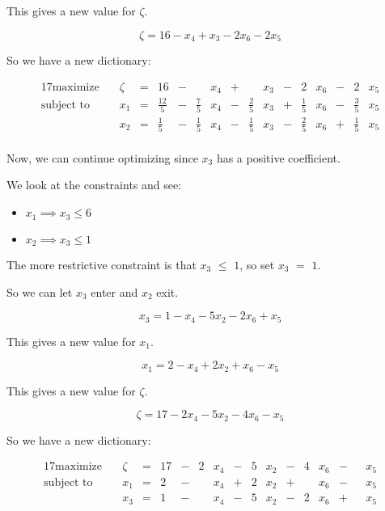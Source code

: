 \documentclass[12pt,letterpaper]{article}
\newcommand*\continueopt[1]{
  Now, we can continue optimizing since #1 has a positive coefficient.
}
\newcommand*\enterexit[2]{
  So we can let #1 enter and #2 exit.
}
\newcommand*\morerestrictive[2]{
  The more restrictive constraint is that #1 $\leq$ #2, so set #1 $=$ #2.
}
\newcommand*\newdict{
  So we have a new dictionary:
}
\newcommand*\newvalue[1]{
  This gives a new value for #1.
}
\begin{document}
\begin{enumerate}
      \newvalue{$\zeta$}

      \[
        \zeta = 16 - x_4 + x_3 - 2x_6 - 2x_5
      \]

      \newdict

      \begin{alignat*}{17}
        \text{maximize}   \quad & \zeta & {}={} & 16           & {}-{} &             & x_4 & {}+{} &             & x_3 & {}-{} & 2           & x_6 & {}-{} & 2            & x_5 \\
        \text{subject to} \quad & x_1   & {}={} & \frac{12}{5} & {}-{} & \frac{7}{5} & x_4 & {}-{} & \frac{2}{5} & x_3 & {}+{} & \frac{1}{5} & x_6 & {}-{} & \frac{3}{5} & x_5 \\
                                & x_2   & {}={} & \frac{1}{5}  & {}-{} & \frac{1}{5} & x_4 & {}-{} & \frac{1}{5} & x_3 & {}-{} & \frac{2}{5} & x_6 & {}+{} & \frac{1}{5} & x_5 \\
      \end{alignat*}

      \continueopt{$x_3$}

      We look at the constraints and see:
      \begin{itemize}
        \item $x_1 \implies x_3 \leq 6$
        \item $x_2 \implies x_3 \leq 1$
      \end{itemize}

      \morerestrictive{$x_3$}{$1$}

      \enterexit{$x_3$}{$x_2$}

      \[
        x_3 = 1 - x_4 - 5x_2 - 2x_6 + x_5
      \]

      \newvalue{$x_1$}

      \[
        x_1 = 2 - x_4 + 2x_2 + x_6 - x_5
      \]

      \newvalue{$\zeta$}

      \[
        \zeta = 17 - 2x_4 - 5x_2 - 4x_6 - x_5
      \]

      \newdict

      \begin{alignat*}{17}
        \text{maximize}   \quad & \zeta & {}={} & 17 & {}-{} & 2 & x_4 & {}-{} & 5 & x_2 & {}-{} & 4 & x_6 & {}-{} &  & x_5 \\
        \text{subject to} \quad & x_1   & {}={} & 2  & {}-{} &   & x_4 & {}+{} & 2 & x_2 & {}+{} &   & x_6 & {}-{} &  & x_5 \\
                                & x_3   & {}={} & 1  & {}-{} &   & x_4 & {}-{} & 5 & x_2 & {}-{} & 2 & x_6 & {}+{} &  & x_5 \\
      \end{alignat*}


\end{enumerate}
\end{document}
